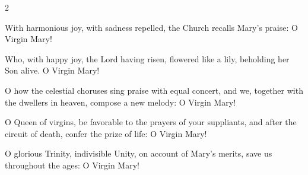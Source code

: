 \begin{multicols}{2}
\raggedcolumns
\begin{enpars}
With harmonious joy, with sadness repelled,
the Church recalls Mary’s praise: O Virgin Mary!

Who, with happy joy, the Lord having risen,
flowered like a lily, beholding her Son alive. O Virgin Mary!

O how the celestial choruses sing praise with equal concert, and
we, together with the dwellers in heaven, compose a new melody: O Virgin Mary!

O Queen of virgins, be favorable to the prayers of your suppliants,
and after the circuit of death, confer the prize of life: O Virgin Mary!

O glorious Trinity, indivisible Unity, on account of Mary’s merits, save us throughout the ages:
O Virgin Mary!
\end{enpars}\end{multicols}